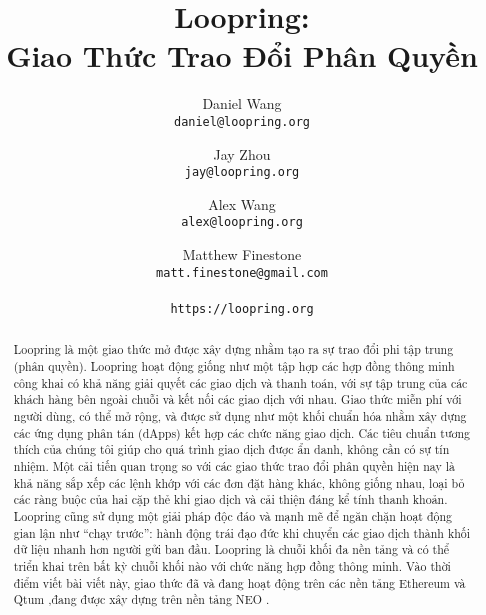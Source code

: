 \documentclass{article}
\title{\textbf{Loopring:}\\\textbf{Giao Thức Trao Đổi Phân Quyền}}
\author{
  Daniel Wang\\
  \texttt{daniel@loopring.org}\\
  \and
  	Jay Zhou\\
  	\texttt{jay@loopring.org}\\
  	\and
  	Alex Wang\\
  	\texttt{alex@loopring.org}\\
  	\and
  	Matthew Finestone\\
  	\texttt{matt.finestone@gmail.com}\\ 
  \\
  \texttt{https://loopring.org}
 }
\begin{document}
\maketitle


\begin{abstract}
Loopring là một giao thức mở được xây dựng nhằm tạo ra sự trao đổi phi tập trung (phân quyền). Loopring hoạt động giống như một tập hợp các hợp đồng thông minh công khai có khả năng giải quyết các giao dịch và thanh toán, với sự tập trung của các khách hàng bên ngoài chuỗi và kết nối các giao dịch với nhau. Giao thức miễn phí với người dùng, có thể mở rộng, và được sử dụng như một khối chuẩn hóa nhằm xây dựng các ứng dụng phân tán (dApps) kết hợp các chức năng giao dịch. Các tiêu chuẩn tương thích của chúng tôi giúp cho quá trình giao dịch được ẩn danh, không cần có sự tín nhiệm. Một cải tiến quan trọng so với các giao thức trao đổi phân quyền hiện nay là khả năng sắp xếp các lệnh khớp với các đơn đặt hàng khác, không giống nhau, loại bỏ các ràng buộc của hai cặp thẻ khi giao dịch và cải thiện đáng kể tính thanh khoản. Loopring cũng sử dụng một giải pháp độc đáo và mạnh mẽ để ngăn chặn hoạt động gian lận như “chạy trước”: hành động trái đạo đức khi chuyển các giao dịch thành khối dữ liệu nhanh hơn người gửi ban đầu. Loopring là chuỗi khối đa nền tảng và có thể triển khai trên bất kỳ chuỗi khối nào với chức năng hợp đồng thông minh. Vào thời điểm viết bài viết này, giao thức đã và đang hoạt động trên các nền tảng Ethereum  \cite{buterin2017ethereum} \cite{wood2014ethereum} và Qtum \cite{dai2017smart} ,đang được xây dựng trên nền tảng NEO \cite{atterlonn2018distributed} .
\end{abstract}
\end{document}
